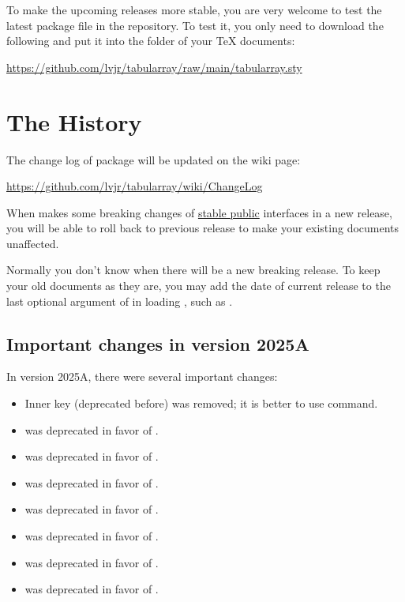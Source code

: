 \documentclass[oneside]{book}
\begin{document}
{To make the upcoming releases more stable, you are very welcome to test the latest package file
in the repository. To test it, you only need to download the following 
and put it into the folder of your TeX documents:\newline
\centerline{\url{https://github.com/lvjr/tabularray/raw/main/tabularray.sty}}

\section{The History}

The change log of  package will be updated on the wiki page:\newline
\centerline{\url{https://github.com/lvjr/tabularray/wiki/ChangeLog}}

When  makes some breaking changes of \underline{stable public} interfaces in a new release,
you will be able to roll back to previous release to make your existing documents unaffected.

Normally you don't know when there will be a new breaking release.
To keep your old documents as they are, you may add the date of current release
to the last optional argument of \CC{\usepackage} in loading ,
such as \CC{\usepackage{tabularray}[=2024-02-16]}.

\subsection{Important changes in version 2025A}

In version 2025A, there were several important changes:

\begin{itemize}[nosep]
  \item Inner key  (deprecated before) was removed;
        it is better to use \CC{\fakeverb} command.
  \item \CC{\DefTblrTemplate} was deprecated in favor of \CC{\DeclareTblrTemplate}.
  \item \CC{\NewColumnType} was deprecated in favor of \CC{\NewTblrColumnType}.
  \item \CC{\NewRowType} was deprecated in favor of \CC{\NewTblrRowType}.
  \item \CC{\NewColumnRowType} was deprecated in favor of \CC{\NewTblrColumnRowType}.
  \item \CC{\NewDashStyle} was deprecated in favor of \CC{\NewTblrDashStyle}.
  \item \CC{\NewTableCommand} was deprecated in favor of \CC{\NewTblrTableCommand}.
  \item \CC{\tablewidth} was deprecated in favor of \CC{\lTblrTableWidthDim}.
\end{itemize}

}
\end{document}
